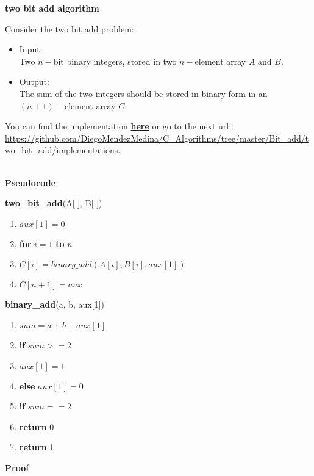 \documentclass[12pt, twoside, a4paper]{article}
\begin{document}
\begin{center}
  {\large \bfseries two bit add algorithm \par}
\end{center}
  Consider the two bit add problem:
\begin{itemize}
\item Input:\\
  Two $n-$bit binary integers, stored in two $n-$element array $A$ and $B$.
\item Output:\\
  The sum of the two integers should be stored in binary form in an
  $(n+1)-$element array $C$.  
\end{itemize}
You can find the implementation \href{https://github.com/DiegoMendezMedina/C_Algorithms/tree/master/Bit_add/two_bit_add/implementations}{\textbf{here}} or go to the next url: \url{https://github.com/DiegoMendezMedina/C_Algorithms/tree/master/Bit_add/two_bit_add/implementations}. \\ \\
\begin{center}
  {\large \textbf{Pseudocode} \par}
\end{center}
\textbf{two\_bit\_add}(A[ ], B[ ])
\begin{enumerate}
\item $aux[1] = 0$
\item \textbf{for} $i = 1$ \textbf{to} $n$
\item \hspace{.5cm} $C[i] = binary\_add(A[i], B[i], aux[1])$
\item  $C[n+1] = aux$
\end{enumerate}
\vspace{.5cm}
\textbf{binary\_add}(a, b, aux[1])
\begin{enumerate}
\item $sum = a + b + aux[1]$
\item \textbf{if} $sum >= 2$
\item \hspace{.5cm} $aux[1] = 1$
\item \textbf{else} $aux[1] = 0$
\item \textbf{if} $sum == 2$
\item \hspace{.5cm} \textbf{return} 0
\item \textbf{return} 1
\end{enumerate}
\newpage
\begin{center}
    {\large \textbf{Proof} \par}
  \end{center}
\end{document}

